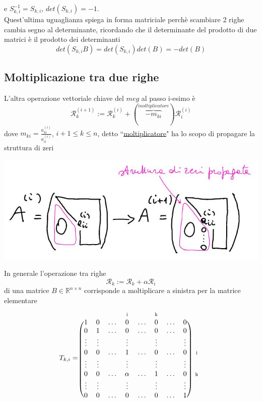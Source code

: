 e \quad $S^{-1}_{k,i}=S_{k,i}$, \quad   $det(S_{k,i})=-1$.\\Quest'ultima uguaglianza spiega in forma matriciale perchè scambiare 2 righe cambia segno al determinante, ricordando che il determinante del prodotto di due matrici è il prodotto dei determinanti 
\begin{equation*}
    det(S_{k,i}B)=det(S_{k,i})det(B)=-det(B)
\end{equation*}

\subsection{Moltiplicazione tra due righe}
L'altra operazione vettoriale chiave del $meg$ al passo i-esimo è
\begin{equation*}
    \mathcal{R}^{(i+1)}_k:=\mathcal{R}^{(i)}_k+(\overbrace{-m_{ki}}^{moltiplicatore})\mathcal{R}^{(i)}_i
\end{equation*}
dove $m_{ki}=\frac{a_{ki}^{(i)}}{a_{ii}^{(i)}}$, $i+1\leq k\leq n$, detto ``\uline{moltiplicatore}" ha lo scopo di propagare la struttura di zeri
\begin{center}
    \includegraphics[scale=0.5]{foto/calcolo_2.JPG}    
\end{center}
In generale l'operazione tra righe
\begin{equation*}
    \mathcal{R}_k:=\mathcal{R}_k+\alpha\mathcal{R}_i
\end{equation*}
di una matrice $B\in\mathbb{R}^{n\times n}$ corrisponde a moltiplicare a sinistra per la matrice elementare
\[
    T_{k,i}=\begin{blockarray}{ccccccccc}
    & & & \matindex{i} & &  \matindex{k} & & \\
        \begin{block}{(cccccccc)c}
        1 & 0 & \dots & 0 & \dots & 0 & \dots & 0 \\
        0 & 1 & \dots & 0 & \dots & 0 & \dots & 0 \\
        \vdots & \vdots &  & \vdots &  & \vdots &  & \vdots \\
        0 & 0 & \dots & 1 & \dots & 0 & \dots & 0 & \matindex{i} \\
        \vdots & \vdots &  & \vdots &  & \vdots &  & \vdots \\
        0 & 0 & \dots & \alpha & \dots & 1 & \dots & 0 & \matindex{k} \\
        \vdots & \vdots &  & \vdots &  & \vdots &  & \vdots \\
        0 & 0 & \dots & 0 & \dots & 0 & \dots & 1 \\
        \end{block}
    \end{blockarray}
\]
